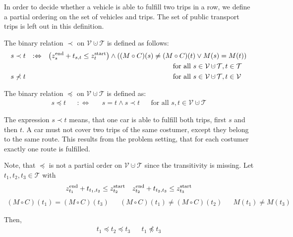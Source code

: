 In order to decide whether a vehicle is able to fulfill two trips in a row, we define a partial ordering on the set of vehicles and trips. The set of public transport trips is left out in this definition.

\begin{definition}
\label{def:partial_order}

The binary relation $\prec$ on $\mathcal{V}\cupdot\mathcal{T}$ is defined as follows:
\begin{align*}
	s\prec t && :\Leftrightarrow && \left(\zend_s + t_{s,t} \leq \zstart_t\right)\land\left((M\circ C)(s)\neq (M\circ C)(t)\lor M(s)=M(t)\right) \\
	&&&& \text{for all } s\in\mathcal{V}\cupdot\mathcal{T}, t\in\mathcal{T} \hphantom{\mathcal{V}} \\
	s\not\prec t &&&& \text{for all } s\in\mathcal{V}\cupdot\mathcal{T}, t\in\mathcal{V} \hphantom{\mathcal{T}}
\end{align*}

The binary relation $\preceq$ on $\mathcal{V}\cupdot\mathcal{T}$ is defined as:
\begin{align*}
	s\preceq t && :\Leftrightarrow && s=t \land s\prec t && \text{for all } s,t\in\mathcal{V}\cupdot\mathcal{T}
\end{align*}

\end{definition}

The expression $s\prec t$ means, that one car is able to fulfill both trips, first $s$ and then $t$. A car must not cover two trips of the same costumer, except they belong to the same route. This results from the problem setting, that for each costumer exactly one route is fulfilled. 

\begin{remark}

Note, that $\preceq$ is not a partial order on $\mathcal{V}\cupdot\mathcal{T}$ since the transitivity is missing. Let $t_1,t_2,t_3\in\mathcal{T}$ with 
\begin{align*}
	z^{\operatorname{end}}_{t_1} + t_{t_1,t_2} \leq z^{\operatorname{start}}_{t_2} && z^{\operatorname{end}}_{t_2} + t_{t_2,t_3} \leq z^{\operatorname{start}}_{t_3}
\end{align*}
\begin{align*}
	(M\circ C)\left(t_1\right) = (M\circ C)\left(t_3\right) && (M\circ C)\left(t_1\right) \neq (M\circ C)\left(t_2\right) && M\left(t_1\right)\neq M\left(t_3\right)
\end{align*}

Then,
\begin{align*}
	t_1 \preceq t_2 \preceq t_3 && t_1 \not\preceq t_3
\end{align*}

\end{remark}

